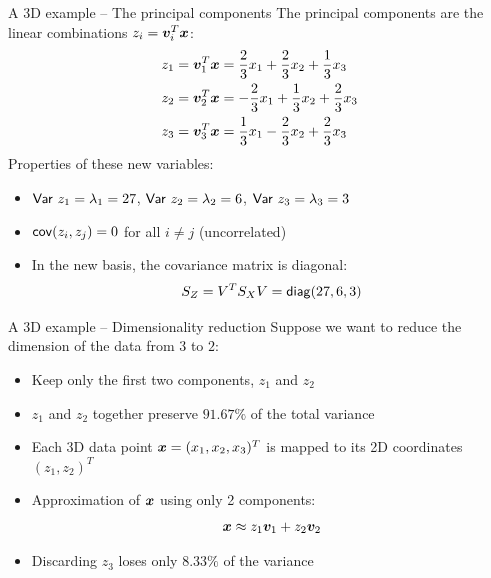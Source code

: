 \documentclass[aspectratio=169]{beamer}\usepackage[]{graphicx}\usepackage[]{xcolor}
\begin{document}
\begin{frame}{A 3D example -- The principal components}
The principal components are the linear combinations $z_i = \bm{v}_i^T\bm{x}$:
\begin{align*}
z_1 &= \bm{v}_1^T\bm{x} = \frac{2}{3}x_1 + \frac{2}{3}x_2 + \frac{1}{3}x_3 \\
z_2 &= \bm{v}_2^T\bm{x} = -\frac{2}{3}x_1 + \frac{1}{3}x_2 + \frac{2}{3}x_3 \\
z_3 &= \bm{v}_3^T\bm{x} = \frac{1}{3}x_1 - \frac{2}{3}x_2 + \frac{2}{3}x_3
\end{align*}
\vfill
Properties of these new variables:
\begin{itemize}
    \item $\mathsf{Var}\  z_1 = \lambda_1 = 27$, $\mathsf{Var}\  z_2 = \lambda_2 = 6$, $\mathsf{Var}\  z_3 = \lambda_3 = 3$
    \item $\mathsf{cov}(z_i, z_j) = 0$ for all $i \neq j$ (uncorrelated)
    \item In the new basis, the covariance matrix is diagonal:
    \[
    S_Z = V^T S_X V = \mathsf{diag}(27, 6, 3)
    \]
\end{itemize}
\end{frame}


\begin{frame}{A 3D example -- Dimensionality reduction}
Suppose we want to reduce the dimension of the data from $3$ to $2$:
\vfill
\begin{itemize}
    \item Keep only the first two components, $z_1$ and $z_2$
    \item $z_1$ and $z_2$ together preserve $91.67\%$ of the total variance
    \item Each 3D data point $\bm{x}=(x_1,x_2,x_3)^T$ is mapped to its 2D coordinates $(z_1,z_2)^T$
    \item Approximation of $\bm{x}$ using only 2 components:
    \[
    \bm{x} \approx z_1 \bm{v}_1 + z_2 \bm{v}_2
    \]
    \item Discarding $z_3$ loses only $8.33\%$ of the variance
\end{itemize}
\end{frame}
\end{document}
